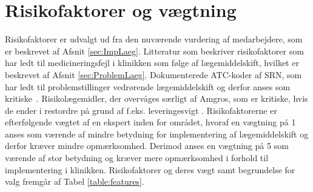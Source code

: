 \section{Risikofaktorer og vægtning}
Risikofaktorer er udvalgt ud fra den nuværende vurdering af medarbejdere, som er beskrevet af Afsnit \ref{sec:ImpLaeg}. Litteratur som beskriver risikofaktorer som har ledt til medicineringsfejl i klinikken som følge af lægemiddelskift, hvilket er beskrevet af Afsnit \ref{sec:ProblemLaeg}. Dokumenterede ATC-koder af SRN, som har ledt til problemstillinger vedrørende lægemiddelskift og derfor anses som kritiske~\citep{SRN}. Risikolægemidler, der overvåges særligt af Amgros, som er kritiske, hvis de ender i restordre på grund af f.eks. leveringesvigt \citep{Amgros}. Risikofaktorerne er efterfølgende vægtet af en ekspert inden for området, hvoraf en vægtning på 1 anses som værende af mindre betydning for implementering af lægemiddelskift og derfor kræver mindre opmærksomhed. Derimod anses en vægtning på 5 som værende af stor betydning og kræver mere opmærksomhed i forhold til implementering i klinikken.
Risikofaktorer og deres vægt samt begrundelse for valg fremgår af Tabel \ref{table:features}.


